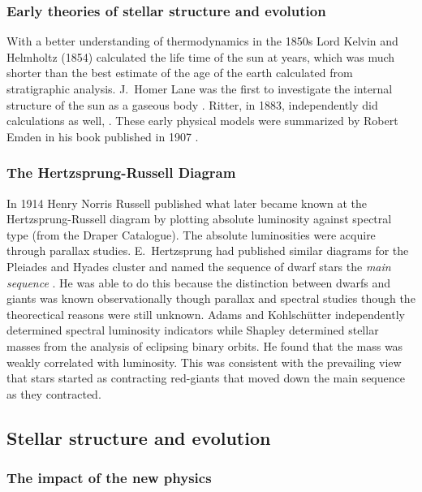 \subsubsection{Early theories of stellar structure and evolution}

With a better understanding of thermodynamics in the
1850s Lord Kelvin and Helmholtz (1854) calculated the life time of the
sun at  years, which was much shorter than the best
estimate of the age of the earth calculated from stratigraphic
analysis. J.~Homer Lane was the first to investigate the internal
structure of the sun as a gaseous body \cite{Lane1870}. Ritter, in
1883, independently did calculations as well, \cite{Ritter1883,
Ritter1883a, Ritter1898}. These early physical
models were summarized by Robert Emden in his book 
published in 1907 \cite{Emden1907}.

\subsubsection{The Hertzsprung-Russell Diagram}

In 1914  Henry Norris Russell \cite{Russell1914a,
Russell1914b} published what later became known at the
Hertzsprung-Russell diagram by plotting absolute luminosity against
spectral type (from the Draper Catalogue). The absolute luminosities
were acquire through parallax studies. E.~Hertzsprung
 had published similar diagrams for the Pleiades
and Hyades cluster and named the sequence of dwarf stars
the \textit{main sequence} \cite{Hertzsprung1911}.  He was able to do
this because the distinction between dwarfs and giants was known
observationally though parallax and spectral studies though the
theorectical reasons were still unknown. Adams and 
Kohlschütter \cite{Adams1914} independently determined spectral
luminosity indicators while Shapley determined stellar masses from the
analysis of eclipsing binary orbits. He found that the mass was weakly
correlated with luminosity.  This was consistent with the prevailing
view that stars started as contracting red-giants that moved down the
main sequence as they contracted.


\subsection{Stellar structure and evolution}

\subsubsection{The impact of the new physics}

